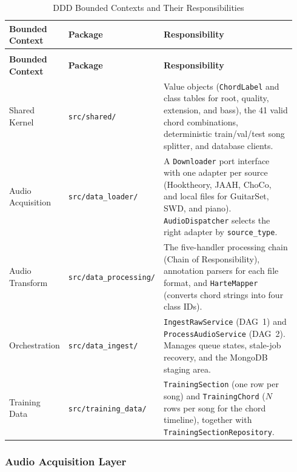 \documentclass[a4paper]{article}
\begin{document}
\begin{longtable}{@{}
    >{\raggedright\arraybackslash}p{0.19\linewidth}
    >{\raggedright\arraybackslash}p{0.25\linewidth}
    >{\raggedright\arraybackslash}p{0.50\linewidth}@{}}

    \caption{DDD Bounded Contexts and Their Responsibilities}\label{tab:bounded_contexts} \\
    \toprule
    \textbf{Bounded Context} & \textbf{Package} & \textbf{Responsibility} \\
    \midrule
    \endfirsthead
    \multicolumn{3}{l}{\footnotesize\itshape (Table~\ref{tab:bounded_contexts} continued)}\\
    \toprule
    \textbf{Bounded Context} & \textbf{Package} & \textbf{Responsibility} \\
    \midrule
    \endhead
    \bottomrule
    \endlastfoot

    Shared Kernel & \texttt{src/shared/} & Value objects (\texttt{ChordLabel} and class tables for root, quality, extension, and bass), the 41 valid chord combinations, deterministic train/val/test song splitter, and database clients. \\
    \addlinespace
    Audio Acquisition & \texttt{src/data\_loader/} & A \texttt{Downloader} port interface with one adapter per source (Hooktheory, JAAH, ChoCo, and local files for GuitarSet, SWD, and piano). \texttt{AudioDispatcher} selects the right adapter by \texttt{source\_type}. \\
    \addlinespace
    Audio Transform & \texttt{src/data\_processing/} & The five-handler processing chain (Chain of Responsibility), annotation parsers for each file format, and \texttt{HarteMapper} (converts chord strings into four class IDs). \\
    \addlinespace
    Orchestration & \texttt{src/data\_ingest/} & \texttt{IngestRawService} (DAG~1) and \texttt{ProcessAudioService} (DAG~2). Manages queue states, stale-job recovery, and the MongoDB staging area. \\
    \addlinespace
    Training Data & \texttt{src/training\_data/} & \texttt{TrainingSection} (one row per song) and \texttt{TrainingChord} ($N$ rows per song for the chord timeline), together with \texttt{TrainingSectionRepository}. \\
\end{longtable}

\subsubsection{Audio Acquisition Layer}
\end{document}
